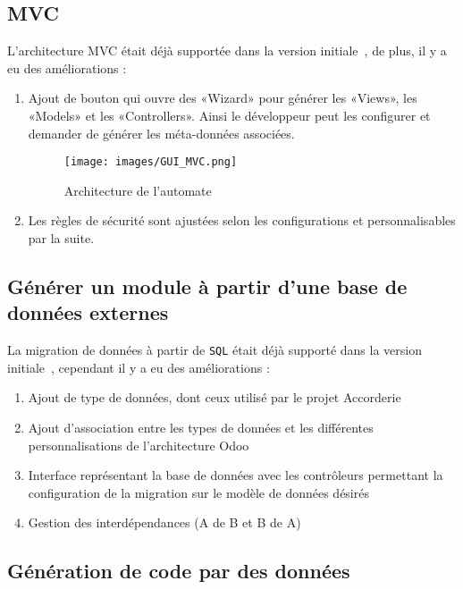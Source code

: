 \subsection{MVC}

L’architecture MVC était déjà supportée dans la version initiale~\cite{bluiksnot_repo}, de plus, il y a eu des améliorations : 

\begin{enumerate}
 \item Ajout de bouton qui ouvre des «Wizard» pour générer les «Views», les «Models» et les «Controllers». Ainsi le développeur peut les configurer et demander de générer les méta-données associées.
    \begin{figure}[htb]
    \centering
    \texttt{[image: images/GUI\_MVC.png]}
    \caption{Architecture de l'automate}
    \label{fig:dia_gui_mvc}
    \end{figure}
 \item Les règles de sécurité sont ajustées selon les configurations et personnalisables par la suite.
\end{enumerate}

\subsection{Générer un module à partir d’une base de données externes}


La migration de données à partir de \texttt{SQL} était déjà supporté dans la version initiale~\cite{bluiksnot_repo}, cependant il y a eu des améliorations : 

\begin{enumerate}
    \item Ajout de type de données, dont ceux utilisé par le projet Accorderie
    \item Ajout d'association entre les types de données et les différentes personnalisations de l’architecture Odoo
    \item Interface représentant la base de données avec les contrôleurs permettant la configuration de la migration sur le modèle de données désirés
    \item Gestion des interdépendances (A de B et B de A)
\end{enumerate}

\subsection{Génération de code par des données}

